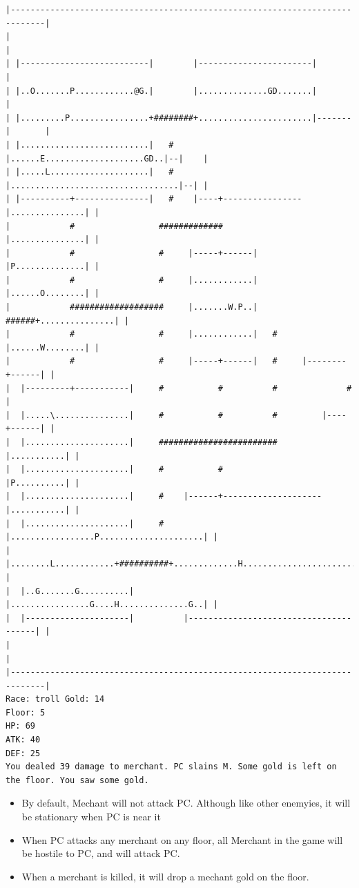\documentclass[11pt]{article}
\theoremstyle{plain}
\begin{document}
\newpage
\begin{Verbatim}[fontsize=\scriptsize]
|-----------------------------------------------------------------------------|
|                                                                             |
| |--------------------------|        |-----------------------|               |
| |..O.......P............@G.|        |..............GD.......|               |
| |.........P................+########+.......................|-------|       |
| |..........................|   #    |......E....................GD..|--|    |
| |.....L....................|   #    |..................................|--| |
| |----------+---------------|   #    |----+----------------|...............| |
|            #                 #############                |...............| |
|            #                 #     |-----+------|         |P..............| |
|            #                 #     |............|         |......O........| |
|            ###################     |.......W.P..|   ######+...............| |
|            #                 #     |............|   #     |......W........| |
|            #                 #     |-----+------|   #     |--------+------| |
|  |---------+-----------|     #           #          #              #        |
|  |.....\...............|     #           #          #         |----+------| |
|  |.....................|     ########################         |...........| |
|  |.....................|     #           #                    |P..........| |
|  |.....................|     #    |------+--------------------|...........| |
|  |.....................|     #    |.................P.....................| |
|  |........L............+##########+.............H.........................| |
|  |..G.......G..........|          |................G....H..............G..| |
|  |---------------------|          |---------------------------------------| |
|                                                                             |
|-----------------------------------------------------------------------------|
Race: troll Gold: 14                                                   Floor: 5
HP: 69
ATK: 40
DEF: 25
You dealed 39 damage to merchant. PC slains M. Some gold is left on the floor. You saw some gold. 
\end{Verbatim}

\begin{itemize}
    \item By default, Mechant will not attack PC. Although like other enemyies, 
    it will be stationary when PC is near it
    \item When PC attacks any merchant on any floor, all Merchant in the game will
    be hostile to PC, and will attack PC.
    \item When a merchant is killed, it will drop a mechant gold on the floor.
\end{itemize}
\end{document}
